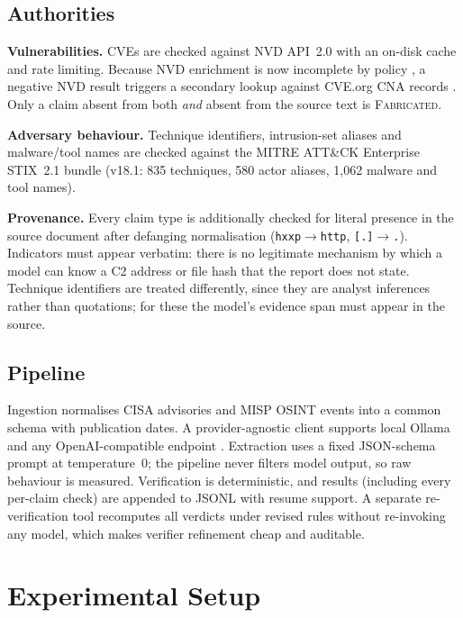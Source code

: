 \documentclass[10pt,twocolumn]{article}
\begin{document}
\subsection{Authorities}
\textbf{Vulnerabilities.} CVEs are checked against NVD API~2.0 \cite{nvdapi}
with an on-disk cache and rate limiting. Because NVD enrichment is now
incomplete by policy \cite{nist2026nvd}, a negative NVD result triggers a
secondary lookup against CVE.org CNA records \cite{cveorg}. Only a claim absent
from both \emph{and} absent from the source text is \textsc{Fabricated}.

\textbf{Adversary behaviour.} Technique identifiers, intrusion-set aliases and
malware/tool names are checked against the MITRE ATT\&CK Enterprise STIX~2.1
bundle \cite{attackstix,oasis2021stix,strom2018attack} (v18.1: 835 techniques,
580 actor aliases, 1{,}062 malware and tool names).

\textbf{Provenance.} Every claim type is additionally checked for literal
presence in the source document after defanging normalisation
(\texttt{hxxp}$\rightarrow$\texttt{http}, \texttt{[.]}$\rightarrow$\texttt{.}).
Indicators must appear verbatim: there is no legitimate mechanism by which a
model can know a C2 address or file hash that the report does not state.
Technique identifiers are treated differently, since they are analyst
inferences rather than quotations; for these the model's evidence span must
appear in the source.

\subsection{Pipeline}
Ingestion normalises CISA advisories \cite{cisaadvisories} and MISP OSINT
events \cite{wagner2016misp,circlfeed} into a common schema with publication
dates. A provider-agnostic client supports local Ollama \cite{ollama} and any
OpenAI-compatible endpoint \cite{openrouter}. Extraction uses a fixed
JSON-schema prompt at temperature~0; the pipeline never filters model output,
so raw behaviour is measured. Verification is deterministic, and results
(including every per-claim check) are appended to JSONL with resume support.
A separate re-verification tool recomputes all verdicts under revised rules
without re-invoking any model, which makes verifier refinement cheap and
auditable.

\section{Experimental Setup}
\label{sec:setup}
\end{document}
